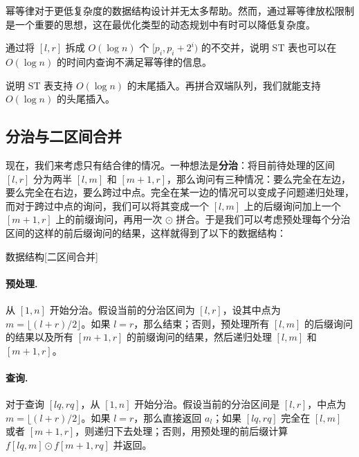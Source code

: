 \begin{remark}
   幂等律对于更低复杂度的数据结构设计并无太多帮助。然而，通过幂等律放松限制是一个重要的思想，这在最优化类型的动态规划中有时可以降低复杂度。 
\end{remark}

\begin{exercise}
    通过将 $[l,r]$ 拆成 $O(\log n)$ 个 $[p_i,p_i+2^i)$ 的不交并，说明 ST 表也可以在 $O(\log n)$ 的时间内查询不满足幂等律的信息。
\end{exercise}
\begin{exercise}
    说明 ST 表支持 $O(\log n)$ 的末尾插入。再拼合双端队列，我们就能支持 $O(\log n)$ 的头尾插入。
\end{exercise}

\subsection{分治与二区间合并}

现在，我们来考虑只有结合律的情况。一种想法是\textbf{分治}：将目前待处理的区间 $[l,r]$ 分为两半 $[l,m]$ 和 $[m+1,r]$，那么询问有三种情况：要么完全在左边，要么完全在右边，要么跨过中点。完全在某一边的情况可以变成子问题递归处理，而对于跨过中点的询问，我们可以将其变成一个 $[l,m]$ 上的后缀询问加上一个 $[m+1,r]$ 上的前缀询问，再用一次 $\odot$ 拼合。于是我们可以考虑预处理每个分治区间的这样的前后缀询问的结果，这样就得到了以下的数据结构：

\begin{descbox}{数据结构}[二区间合并]\label{desc: two-interval-merge}
\paragraph{预处理. }从 $[1,n]$ 开始分治。假设当前的分治区间为 $[l,r]$，设其中点为 $m=\lfloor (l+r)/2\rfloor$。如果 $l=r$，那么结束；否则，预处理所有 $[l,m]$ 的后缀询问的结果以及所有 $[m+1,r]$ 的前缀询问的结果，然后递归处理 $[l,m]$ 和 $[m+1,r]$。

\paragraph{查询. }对于查询 $[lq,rq]$，从 $[1,n]$ 开始分治。假设当前的分治区间是 $[l,r]$，中点为 $m=\lfloor (l+r)/2\rfloor$。如果 $l=r$，那么直接返回 $a_l$；如果 $[lq,rq]$ 完全在 $[l,m]$ 或者 $[m+1,r]$，则递归下去处理；否则，用预处理的前后缀计算 $f[lq,m]\odot f[m+1,rq]$ 并返回。
\end{descbox}

